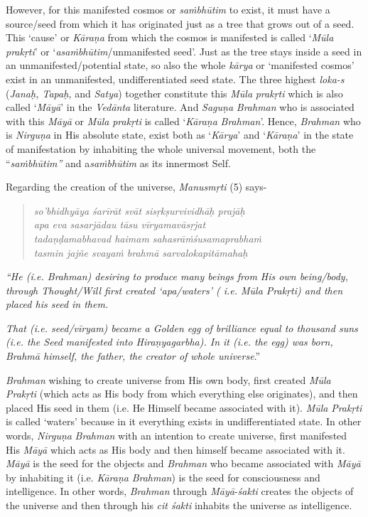 However, for this manifested cosmos or \emph{saṁbhūtim} to exist, it must have a source/seed from which it has originated just as a tree that grows out of a seed. This `cause' or \emph{Kāraṇa} from which the cosmos is manifested is called `\emph{Mūla} \emph{prakṛti}' or `\emph{asaṁbhūtim}/unmanifested seed'. Just as the tree stays inside a seed in an unmanifested/potential state, so also the whole \emph{kārya} or `manifested cosmos' exist in an unmanifested, undifferentiated seed state. The three highest \emph{loka-s} (\emph{Janaḥ, Tapaḥ,} and \emph{Satya}) together constitute this \emph{Mūla} \emph{prakṛti} which is also called `\emph{Māyā}' in the \emph{Vedānta} literature. And \emph{Saguṇa} \emph{Brahman} who is associated with this \emph{Māyā} or \emph{Mūla} \emph{prakṛti} is called `\emph{Kāraṇa} \emph{Brahman}'. Hence, \emph{Brahman} who is \emph{Nirguṇa} in His absolute state, exist both as `\emph{Kārya}' and `\emph{Kāraṇa}' in the state of manifestation by inhabiting the whole universal movement, both the ``\emph{saṁbhūtim''} and a\emph{saṁbhūtim} as its innermost Self.

Regarding the creation of the universe, \emph{Manusmṛti} (5) says-

\begin{verse}
\emph{so'bhidhyāya śarīrāt svāt sisṛkṣurvividhāḥ prajāḥ }\\
\emph{apa eva sasarjādau tāsu vīryamavāsṛjat }\\
\emph{tadaṇḍamabhavad haimam sahasrāṁśusamaprabhaṁ }\\
\emph{tasmin jajñe svayaṁ brahmā sarvalokapitāmahaḥ }
\end{verse}

\emph{``He (i.e. Brahman) desiring to produce many beings from His own being/body, through Thought/Will first created `apa/waters' ( i.e. Mūla Prakṛti) and then placed his seed in them.}

\emph{That (i.e. seed/vīryam) became a Golden egg of brilliance equal to thousand suns (i.e. the Seed manifested into Hiraṇyagarbha). In it (i.e. the egg) was born, Brahmā himself, the father, the creator of whole universe}.''

\emph{Brahman} wishing to create universe from His own body, first created \emph{Mūla Prakṛti} (which acts as His body from which everything else originates), and then placed His seed in them (i.e. He Himself became associated with it). \emph{Mūla} \emph{Prakṛti} is called `waters' because in it everything exists in undifferentiated state. In other words, \emph{Nirguṇa} \emph{Brahman} with an intention to create universe, first manifested His \emph{Māyā} which acts as His body and then himself became associated with it. \emph{Māyā} is the seed for the objects and \emph{Brahman} who became associated with \emph{Māyā} by inhabiting it (i.e. \emph{Kāraṇa} \emph{Brahman}) is the seed for consciousness and intelligence. In other words, \emph{Brahman} through \emph{Māyā}-\emph{śakti} creates the objects of the universe and then through his \emph{cit śakti} inhabits the universe as intelligence.

